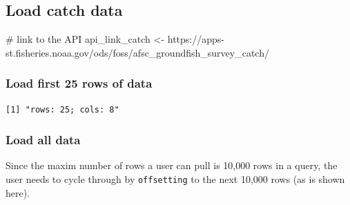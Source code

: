 \documentclass[
  letterpaper,
  oneside,
  open=any]{scrbook}
\newenvironment{Shaded}{\begin{snugshade}}{\end{snugshade}}
\newcommand{\AttributeTok}[1]{\textcolor[rgb]{0.40,0.45,0.13}{#1}}
\newcommand{\CommentTok}[1]{\textcolor[rgb]{0.37,0.37,0.37}{#1}}
\newcommand{\DocumentationTok}[1]{\textcolor[rgb]{0.37,0.37,0.37}{\textit{#1}}}
\newcommand{\FunctionTok}[1]{\textcolor[rgb]{0.28,0.35,0.67}{#1}}
\newcommand{\NormalTok}[1]{\textcolor[rgb]{0.00,0.23,0.31}{#1}}
\newcommand{\OtherTok}[1]{\textcolor[rgb]{0.00,0.23,0.31}{#1}}
\newcommand{\SpecialCharTok}[1]{\textcolor[rgb]{0.37,0.37,0.37}{#1}}
\newcommand{\StringTok}[1]{\textcolor[rgb]{0.13,0.47,0.30}{#1}}
\begin{document}
\subsection{Load catch data}\label{load-catch-data}

\begin{Shaded}
\begin{Highlighting}[]
\CommentTok{\# link to the API}
\NormalTok{api\_link\_catch }\OtherTok{\textless{}{-}} \StringTok{\textquotesingle{}https://apps{-}st.fisheries.noaa.gov/ods/foss/afsc\_groundfish\_survey\_catch/\textquotesingle{}}
\end{Highlighting}
\end{Shaded}

\subsubsection{Load first 25 rows of
data}\label{load-first-25-rows-of-data-1}

\begin{Shaded}
\end{Shaded}

\begin{verbatim}
[1] "rows: 25; cols: 8"
\end{verbatim}

\subsubsection{Load all data}\label{load-all-data-1}

Since the maxim number of rows a user can pull is 10,000 rows in a
query, the user needs to cycle through by \texttt{offsetting} to the
next 10,000 rows (as is shown here).
\end{document}

